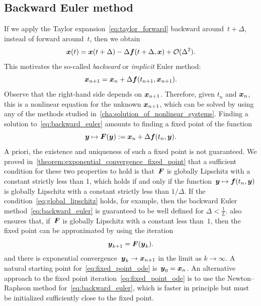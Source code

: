 \subsection{Backward Euler method}
\label{sub:implicit_euler}
If we apply the Taylor expansion~\eqref{eq:taylor_forward} backward around~$t + \Delta$,
instead of forward around~$t$,
then we obtain
\[
    \label{eq:taylor_backward}
    \mathbf{\boldsymbol{x}}(t) = \mathbf{\boldsymbol{x}}(t + \Delta) - \Delta \mathbf{\boldsymbol{f}}(t + \Delta, \mathbf{\boldsymbol{x}}) + \mathcal O(\Delta^2).
\]
This motivates the so-called \emph{backward} or \emph{implicit} Euler method:
\begin{equation}
    \label{eq:backward_euler}
    \mathbf{\boldsymbol{x}}_{n+1} = \mathbf{\boldsymbol{x}}_{n} + \Delta \mathbf{\boldsymbol{f}}(t_{n+1}, \mathbf{\boldsymbol{x}}_{n+1}).
\end{equation}
Observe that the right-hand side depends on $\mathbf{\boldsymbol{x}}_{n+1}$.
Therefore, given $t_n$ and $\mathbf{\boldsymbol{x}}_n$,
this is a nonlinear equation for the unknown $\mathbf{\boldsymbol{x}}_{n+1}$,
which can be solved by using any of the methods studied in~\cref{cha:solution_of_nonlinear_systems}.
Finding a solution to~\eqref{eq:backward_euler} amounts to finding a fixed point of the function
\[
    \mathbf{\boldsymbol{y}} \mapsto \mathbf{\boldsymbol{F}}(\mathbf{\boldsymbol{y}}) := \mathbf{\boldsymbol{x}}_{n} + \Delta \mathbf{\boldsymbol{f}}(t_n, \mathbf{\boldsymbol{y}}).
\]
A priori, the existence and uniqueness of such a fixed point is not guaranteed.
We proved in~\cref{theorem:exponential_convergence_fixed_point} that a sufficient condition for these two properties to hold is
that~$\mathbf{\boldsymbol{F}}$ is globally Lipschitz with a constant strictly less than 1,
which holds if and only if the function~$\mathbf{\boldsymbol{y}} \mapsto \mathbf{\boldsymbol{f}}(t_n, \mathbf{\boldsymbol{y}})$ is globally Lipschitz with a constant strictly less than $1/\Delta$.
If the condition~\eqref{eq:global_lipschitz} holds, for example,
then the backward Euler method~\eqref{eq:backward_euler} is guaranteed to be well defined for $\Delta < \frac{1}{L}$.
 also ensures that, if~$\mathbf{\boldsymbol{F}}$ is globally Lipschitz with a constant less than~$1$,
then the fixed point can be approximated by using the iteration
\begin{equation}
    \label{eq:fixed_point_ode}
    \mathbf{\boldsymbol{y}}_{k+1} = \mathbf{\boldsymbol{F}}(\mathbf{\boldsymbol{y}}_k).
\end{equation}
and there is exponential convergence~$\mathbf{\boldsymbol{y}}_k \to \mathbf{\boldsymbol{x}}_{n+1}$ in the limit as $k \to \infty$.
A natural starting point for~\eqref{eq:fixed_point_ode} is~$\mathbf{\boldsymbol{y}}_0 = \mathbf{\boldsymbol{x}}_n$.
An alternative approach to the fixed point iteration~\eqref{eq:fixed_point_ode} is to use the Newton--Raphson method for~\eqref{eq:backward_euler},
which is faster in principle but must be initialized sufficiently close to the fixed point.

